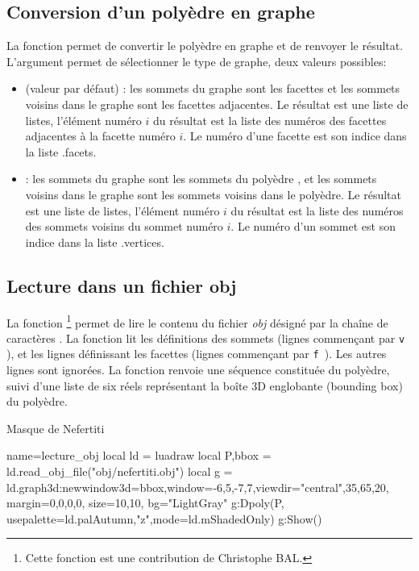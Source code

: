 \subsection{Conversion d'un polyèdre en graphe}

La fonction  permet de convertir le polyèdre  en graphe et de renvoyer le résultat. L'argument  permet de sélectionner le type de graphe, deux valeurs possibles:
\begin{itemize}
    \item {} (valeur par défaut) : les sommets du graphe sont les facettes et les sommets voisins dans le graphe sont les facettes adjacentes. Le résultat est une liste de listes, l'élément numéro $i$ du résultat est la liste des numéros des facettes adjacentes à la facette numéro $i$. Le numéro d'une facette est son indice dans la liste .facets.
    
    \item {} : les sommets du graphe sont les sommets du polyèdre , et les sommets voisins dans le graphe sont les sommets voisins dans le polyèdre. Le résultat est une liste de listes, l'élément numéro $i$ du résultat est la liste des numéros des sommets voisins du sommet numéro $i$. Le numéro d'un sommet est son indice dans la liste .vertices.
\end{itemize}

\subsection{Lecture dans un fichier obj}

La fonction \footnote{Cette fonction est une contribution de Christophe BAL.} permet de lire le contenu du fichier \emph{obj} désigné par la chaîne de caractères . La fonction lit les définitions des sommets (lignes commençant par \verb|v |), et les lignes définissant les facettes (lignes commençant par \verb|f |). Les autres lignes sont ignorées. La fonction renvoie une séquence constituée du polyèdre, suivi d'une liste de six réels  représentant la boîte 3D englobante (bounding box) du polyèdre.

\begin{demo}{Masque de Nefertiti}
\begin{luadraw}{name=lecture_obj}
local ld = luadraw
local P,bbox = ld.read_obj_file("obj/nefertiti.obj")
local g = ld.graph3d:new{window3d=bbox,window={-6,5,-7,7},viewdir={"central",35,65,20},
margin={0,0,0,0}, size={10,10}, bg="LightGray"}
g:Dpoly(P, {usepalette={ld.palAutumn,"z"},mode=ld.mShadedOnly})
g:Show()
\end{luadraw}
\end{demo}

